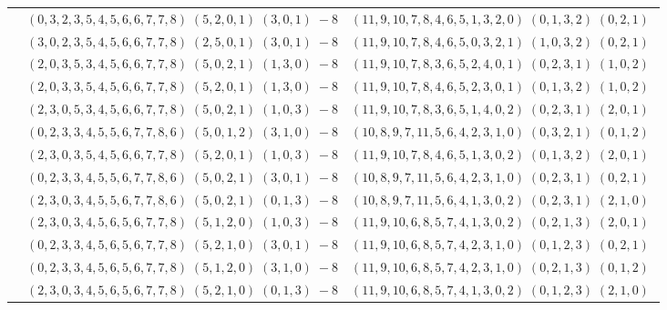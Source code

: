 \documentclass[11pt]{article}
\begin{document}
\begin{longtable}[l]{|c|c|c|}
 \cline{2-3} 
 & $(0 ,3 ,2 ,3 ,5 ,4 ,5 ,6 ,6 ,7 ,7 ,8) \;(5 ,2 ,0 ,1) \;(3 ,0 ,1) \;-8$ & $(11 ,9 ,10 ,7 ,8 ,4 ,6 ,5 ,1 ,3 ,2 ,0) \;(0 ,1 ,3 ,2) \;(0 ,2 ,1) \;$\\ 
 \cline{2-3} 
 & $(3 ,0 ,2 ,3 ,5 ,4 ,5 ,6 ,6 ,7 ,7 ,8) \;(2 ,5 ,0 ,1) \;(3 ,0 ,1) \;-8$ & $(11 ,9 ,10 ,7 ,8 ,4 ,6 ,5 ,0 ,3 ,2 ,1) \;(1 ,0 ,3 ,2) \;(0 ,2 ,1) \;$\\ 
 \cline{2-3} 
 & $(2 ,0 ,3 ,5 ,3 ,4 ,5 ,6 ,6 ,7 ,7 ,8) \;(5 ,0 ,2 ,1) \;(1 ,3 ,0) \;-8$ & $(11 ,9 ,10 ,7 ,8 ,3 ,6 ,5 ,2 ,4 ,0 ,1) \;(0 ,2 ,3 ,1) \;(1 ,0 ,2) \;$\\ 
 \cline{2-3} 
 & $(2 ,0 ,3 ,3 ,5 ,4 ,5 ,6 ,6 ,7 ,7 ,8) \;(5 ,2 ,0 ,1) \;(1 ,3 ,0) \;-8$ & $(11 ,9 ,10 ,7 ,8 ,4 ,6 ,5 ,2 ,3 ,0 ,1) \;(0 ,1 ,3 ,2) \;(1 ,0 ,2) \;$\\ 
 \cline{2-3} 
 & $(2 ,3 ,0 ,5 ,3 ,4 ,5 ,6 ,6 ,7 ,7 ,8) \;(5 ,0 ,2 ,1) \;(1 ,0 ,3) \;-8$ & $(11 ,9 ,10 ,7 ,8 ,3 ,6 ,5 ,1 ,4 ,0 ,2) \;(0 ,2 ,3 ,1) \;(2 ,0 ,1) \;$\\ 
 \cline{2-3} 
 & $(0 ,2 ,3 ,3 ,4 ,5 ,5 ,6 ,7 ,7 ,8 ,6) \;(5 ,0 ,1 ,2) \;(3 ,1 ,0) \;-8$ & $(10 ,8 ,9 ,7 ,11 ,5 ,6 ,4 ,2 ,3 ,1 ,0) \;(0 ,3 ,2 ,1) \;(0 ,1 ,2) \;$\\ 
 \cline{2-3} 
 & $(2 ,3 ,0 ,3 ,5 ,4 ,5 ,6 ,6 ,7 ,7 ,8) \;(5 ,2 ,0 ,1) \;(1 ,0 ,3) \;-8$ & $(11 ,9 ,10 ,7 ,8 ,4 ,6 ,5 ,1 ,3 ,0 ,2) \;(0 ,1 ,3 ,2) \;(2 ,0 ,1) \;$\\ 
 \cline{2-3} 
 & $(0 ,2 ,3 ,3 ,4 ,5 ,5 ,6 ,7 ,7 ,8 ,6) \;(5 ,0 ,2 ,1) \;(3 ,0 ,1) \;-8$ & $(10 ,8 ,9 ,7 ,11 ,5 ,6 ,4 ,2 ,3 ,1 ,0) \;(0 ,2 ,3 ,1) \;(0 ,2 ,1) \;$\\ 
 \cline{2-3} 
 & $(2 ,3 ,0 ,3 ,4 ,5 ,5 ,6 ,7 ,7 ,8 ,6) \;(5 ,0 ,2 ,1) \;(0 ,1 ,3) \;-8$ & $(10 ,8 ,9 ,7 ,11 ,5 ,6 ,4 ,1 ,3 ,0 ,2) \;(0 ,2 ,3 ,1) \;(2 ,1 ,0) \;$\\ 
 \cline{2-3} 
 & $(2 ,3 ,0 ,3 ,4 ,5 ,6 ,5 ,6 ,7 ,7 ,8) \;(5 ,1 ,2 ,0) \;(1 ,0 ,3) \;-8$ & $(11 ,9 ,10 ,6 ,8 ,5 ,7 ,4 ,1 ,3 ,0 ,2) \;(0 ,2 ,1 ,3) \;(2 ,0 ,1) \;$\\ 
 \cline{2-3} 
 & $(0 ,2 ,3 ,3 ,4 ,5 ,6 ,5 ,6 ,7 ,7 ,8) \;(5 ,2 ,1 ,0) \;(3 ,0 ,1) \;-8$ & $(11 ,9 ,10 ,6 ,8 ,5 ,7 ,4 ,2 ,3 ,1 ,0) \;(0 ,1 ,2 ,3) \;(0 ,2 ,1) \;$\\ 
 \cline{2-3} 
 & $(0 ,2 ,3 ,3 ,4 ,5 ,6 ,5 ,6 ,7 ,7 ,8) \;(5 ,1 ,2 ,0) \;(3 ,1 ,0) \;-8$ & $(11 ,9 ,10 ,6 ,8 ,5 ,7 ,4 ,2 ,3 ,1 ,0) \;(0 ,2 ,1 ,3) \;(0 ,1 ,2) \;$\\ 
 \cline{2-3} 
 & $(2 ,3 ,0 ,3 ,4 ,5 ,6 ,5 ,6 ,7 ,7 ,8) \;(5 ,2 ,1 ,0) \;(0 ,1 ,3) \;-8$ & $(11 ,9 ,10 ,6 ,8 ,5 ,7 ,4 ,1 ,3 ,0 ,2) \;(0 ,1 ,2 ,3) \;(2 ,1 ,0) \;$\\ 

\end{longtable}
\end{document}
